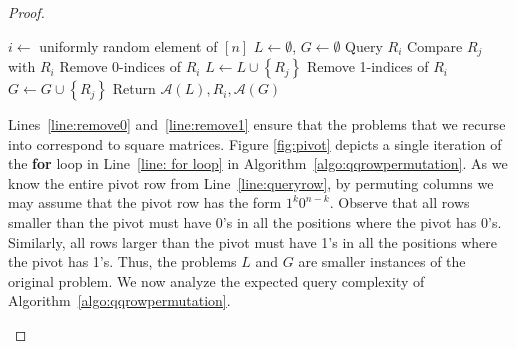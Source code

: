 \documentclass[11pt]{article}
\newcommand{\cA}{\mathcal{A}}
\newcommand{\cbra}[1]{\left\{#1\right\}}
\begin{document}
\begin{proof}
\begin{algorithm}[h]
\begin{algorithmic}[1]
            \Else
                \State $i \gets$ uniformly random element of $[n]$\label{line:random}
                \State $L \gets \emptyset$, $G \gets \emptyset$
                \State Query $R_i$ \label{line:queryrow}
                \For{$j \in [n] \setminus \cbra{i}$}\label{line: for loop}
                    \State Compare $R_j$ with $R_i$\label{line:compare}
                    \label{line: comparison}
                        \State Remove 0-indices of $R_i$ \label{line:remove0}
                        \State $L \gets L \cup \cbra{R_j}$
                    \Else
                        \State Remove 1-indices of $R_i$ \label{line:remove1}
                        \State $G \gets G \cup \cbra{R_j}$
                    \EndIf
                \EndFor
                \State Return $\cA(L), R_i, \cA(G)$\label{line:recurse}
            \EndIf
        \caption{Query algorithm $\cA$ for finding row permutation}
        \label{algo:qqrowpermutation}
        \end{algorithmic}
        \end{algorithm}
        Lines~\ref{line:remove0} and~\ref{line:remove1} ensure that the problems that we recurse into correspond to square matrices.
        Figure \ref{fig:pivot} depicts a single iteration of the \textbf{for} loop in Line~\ref{line: for loop} in Algorithm~\ref{algo:qqrowpermutation}. As we know the entire pivot row from Line~\ref{line:queryrow}, by permuting columns we may assume that the pivot row has the form $1^k0^{n-k}$. Observe that all rows smaller than the pivot must have 0's in all the positions where the pivot has 0's. Similarly, all rows larger than the pivot must have 1's in all the positions where the pivot has 1's. Thus, the problems $L$ and $G$ are smaller instances of the original problem. We now analyze the expected query complexity of Algorithm~\ref{algo:qqrowpermutation}.
            
    \begin{figure}[h!]
        \centering
        \begin{tikzpicture}
        

\end{tikzpicture}
\end{figure}
\end{proof}
\end{document}
